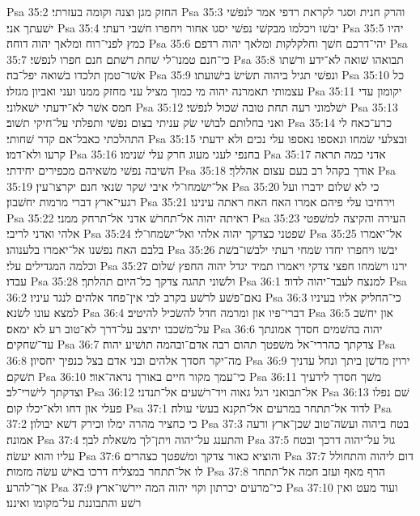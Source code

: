 Psa 35:2  החזק מגן וצנה וקומה בעזרתי׃
Psa 35:3  והרק חנית וסגר לקראת רדפי אמר לנפשׁי ישׁעתך אני׃
Psa 35:4  יבשׁו ויכלמו מבקשׁי נפשׁי יסגו אחור ויחפרו חשׁבי רעתי׃
Psa 35:5  יהיו כמץ לפני־רוח ומלאך יהוה דוחה׃
Psa 35:6  יהי־דרכם חשׁך וחלקלקות ומלאך יהוה רדפם׃
Psa 35:7  כי־חנם טמנו־לי שׁחת רשׁתם חנם חפרו לנפשׁי׃
Psa 35:8  תבואהו שׁואה לא־ידע ורשׁתו אשׁר־טמן תלכדו בשׁואה יפל־בה׃
Psa 35:9  ונפשׁי תגיל ביהוה תשׂישׂ בישׁועתו׃
Psa 35:10  כל עצמותי תאמרנה יהוה מי כמוך מציל עני מחזק ממנו ועני ואביון מגזלו׃
Psa 35:11  יקומון עדי חמס אשׁר לא־ידעתי ישׁאלוני׃
Psa 35:12  ישׁלמוני רעה תחת טובה שׁכול לנפשׁי׃
Psa 35:13  ואני בחלותם לבושׁי שׂק עניתי בצום נפשׁי ותפלתי על־חיקי תשׁוב׃
Psa 35:14  כרע־כאח לי התהלכתי כאבל־אם קדר שׁחותי׃
Psa 35:15  ובצלעי שׂמחו ונאספו נאספו עלי נכים ולא ידעתי קרעו ולא־דמו׃
Psa 35:16  בחנפי לעגי מעוג חרק עלי שׁנימו׃
Psa 35:17  אדני כמה תראה השׁיבה נפשׁי משׁאיהם מכפירים יחידתי׃
Psa 35:18  אודך בקהל רב בעם עצום אהללך׃
Psa 35:19  אל־ישׂמחו־לי איבי שׁקר שׂנאי חנם יקרצו־עין׃
Psa 35:20  כי לא שׁלום ידברו ועל רגעי־ארץ דברי מרמות יחשׁבון׃
Psa 35:21  וירחיבו עלי פיהם אמרו האח האח ראתה עינינו׃
Psa 35:22  ראיתה יהוה אל־תחרשׁ אדני אל־תרחק ממני׃
Psa 35:23  העירה והקיצה למשׁפטי אלהי ואדני לריבי׃
Psa 35:24  שׁפטני כצדקך יהוה אלהי ואל־ישׂמחו־לי׃
Psa 35:25  אל־יאמרו בלבם האח נפשׁנו אל־יאמרו בלענוהו׃
Psa 35:26  יבשׁו ויחפרו יחדו שׂמחי רעתי ילבשׁו־בשׁת וכלמה המגדילים עלי׃
Psa 35:27  ירנו וישׂמחו חפצי צדקי ויאמרו תמיד יגדל יהוה החפץ שׁלום עבדו׃
Psa 35:28  ולשׁוני תהגה צדקך כל־היום תהלתך׃
Psa 36:1  למנצח לעבד־יהוה לדוד׃
Psa 36:2  נאם־פשׁע לרשׁע בקרב לבי אין־פחד אלהים לנגד עיניו׃
Psa 36:3  כי־החליק אליו בעיניו למצא עונו לשׂנא׃
Psa 36:4  דברי־פיו און ומרמה חדל להשׂכיל להיטיב׃
Psa 36:5  און יחשׁב על־משׁכבו יתיצב על־דרך לא־טוב רע לא ימאס׃
Psa 36:6  יהוה בהשׁמים חסדך אמונתך עד־שׁחקים׃
Psa 36:7  צדקתך כהררי־אל משׁפטך תהום רבה אדם־ובהמה תושׁיע יהוה׃
Psa 36:8  מה־יקר חסדך אלהים ובני אדם בצל כנפיך יחסיון׃
Psa 36:9  ירוין מדשׁן ביתך ונחל עדניך תשׁקם׃
Psa 36:10  כי־עמך מקור חיים באורך נראה־אור׃
Psa 36:11  משׁך חסדך לידעיך וצדקתך לישׁרי־לב׃
Psa 36:12  אל־תבואני רגל גאוה ויד־רשׁעים אל־תנדני׃
Psa 36:13  שׁם נפלו פעלי און דחו ולא־יכלו קום׃
Psa 37:1  לדוד אל־תתחר במרעים אל־תקנא בעשׂי עולה׃
Psa 37:2  כי כחציר מהרה ימלו וכירק דשׁא יבולון׃
Psa 37:3  בטח ביהוה ועשׂה־טוב שׁכן־ארץ ורעה אמונה׃
Psa 37:4  והתענג על־יהוה ויתן־לך משׁאלת לבך׃
Psa 37:5  גול על־יהוה דרכך ובטח עליו והוא יעשׂה׃
Psa 37:6  והוציא כאור צדקך ומשׁפטך כצהרים׃
Psa 37:7  דום ליהוה והתחולל לו אל־תתחר במצליח דרכו באישׁ עשׂה מזמות׃
Psa 37:8  הרף מאף ועזב חמה אל־תתחר אך־להרע׃
Psa 37:9  כי־מרעים יכרתון וקוי יהוה המה יירשׁו־ארץ׃
Psa 37:10  ועוד מעט ואין רשׁע והתבוננת על־מקומו ואיננו׃
